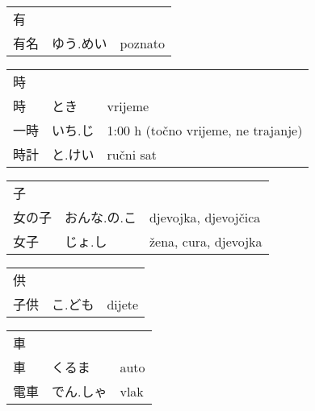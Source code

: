

\newenvironment{dictentry}[1]{
	\begin{tabular}{p{2cm} p{3cm} p{10cm}}
		#1 &&\\
}{
	\end{tabular}
	\vspace{20pt}
}

\newcommand{\example}[3]{
	\hspace*{\fill}#1 & #2 & #3\\
}

\author{ロボット君}


\begin{dictentry}{有}
\example{有名}{ゆう.めい}{poznato}
\end{dictentry}

\begin{dictentry}{時}
\example{時}{とき}{vrijeme}
\example{一時}{いち.じ}{1:00 h (točno vrijeme, ne trajanje)}
\example{時計}{と.けい\footnotemark[1]}{ručni sat}
\end{dictentry}

\begin{dictentry}{子}
\example{女の子}{おんな.の.こ}{djevojka, djevojčica}
\example{女子}{じょ.し}{žena, cura, djevojka}
\end{dictentry}

\begin{dictentry}{供}
\example{子供}{こ.ども}{dijete}
\end{dictentry}

\begin{dictentry}{車}
\example{車}{くるま}{auto}
\example{電車}{でん.しゃ}{vlak}
\end{dictentry}


